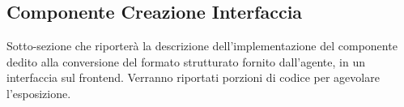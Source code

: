 \subsection{Componente Creazione Interfaccia}

Sotto-sezione che riporterà la descrizione dell'implementazione del componente dedito alla conversione del formato strutturato fornito dall'agente, in un interfaccia sul frontend.
Verranno riportati porzioni di codice per agevolare l'esposizione.
